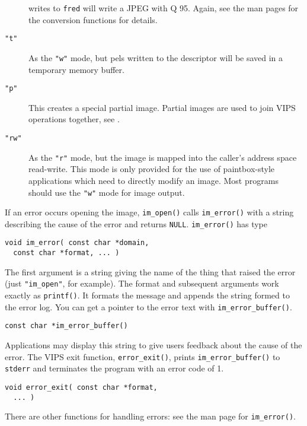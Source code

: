 \begin{description}
\noindent
writes to \verb+fred+ will write a JPEG with Q 95. Again, see the man pages
for the conversion functions for details.

\item[\texttt{"t"}]
As the \verb+"w"+ mode, but pels written to the descriptor will be saved
in a temporary memory buffer.

\item[\texttt{"p"}] 
This creates a special partial image. Partial images are used to join VIPS
operations together, see .

\item[\texttt{"rw"}]
As the \verb+"r"+ mode, but the image is mapped into the caller's address
space read-write. This mode is only provided for the use of paintbox-style
applications which need to directly modify an image. Most programs should
use the \verb+"w"+ mode for image output.

\end{description}

If an error occurs opening the image, \verb+im_open()+ calls
\verb+im_error()+ with a string describing the cause of the error and
returns \verb+NULL+. \verb+im_error()+ has type

\begin{verbatim}
void im_error( const char *domain,
  const char *format, ... )
\end{verbatim}

\noindent
The first argument is a string giving the name of the thing that raised
the error (just \verb+"im_open"+, for example). The format and subsequent
arguments work exactly as \verb+printf()+.  It formats the message and
appends the string formed to the error log. You can get a pointer to the
error text with \verb+im_error_buffer()+.

\begin{verbatim}
const char *im_error_buffer()
\end{verbatim}

\noindent
Applications may display this string to give users feedback about the
cause of the error. The VIPS exit function, \verb+error_exit()+, prints
\verb+im_error_buffer()+ to \verb+stderr+ and terminates the program with an
error code of 1.

\begin{verbatim}
void error_exit( const char *format, 
  ... )
\end{verbatim}

\noindent
There are other functions for handling errors: see the man page for
\verb+im_error()+.

